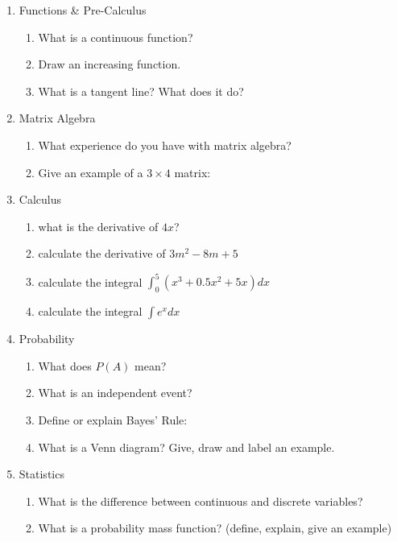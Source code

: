 \documentclass[10pt]{article}
\begin{document}
\begin{enumerate}
\item Functions \& Pre-Calculus
\begin{enumerate}
\item What is a continuous function?
\item Draw an increasing function. \\
\newline
\newline
\newline
\item What is a tangent line? What does it do? \\
\end{enumerate}

\item Matrix Algebra
\begin{enumerate}

\item What experience do you have with matrix algebra?
\vspace{4mm}
\item Give an example of a $3 \times 4$ matrix: 
\vspace{4mm}
\end{enumerate}

\item Calculus 
\begin{enumerate}
\item what is the derivative of $4x$? \\
\item calculate the derivative of $3m^2-8m+5$ \\
\item calculate the integral $\int_{0}^{5}  (x^3+0.5x^2+5x)dx$ \\
\item calculate the integral $\int e^x dx$ \\
\end{enumerate}

\item Probability
\begin{enumerate}
\item What does $P(A)$ mean?
\item What is an independent event?
\vspace{3mm}
\item Define or explain Bayes' Rule:
\vspace{3mm}
\item What is a Venn diagram? Give, draw and label an example.
\end{enumerate}

\item Statistics
\begin{enumerate}
\item What is the difference between continuous and discrete variables?
\vspace{3mm}
\item What is a probability mass function? (define, explain, give an example)
\end{enumerate}

\end{enumerate} 
\end{document}
